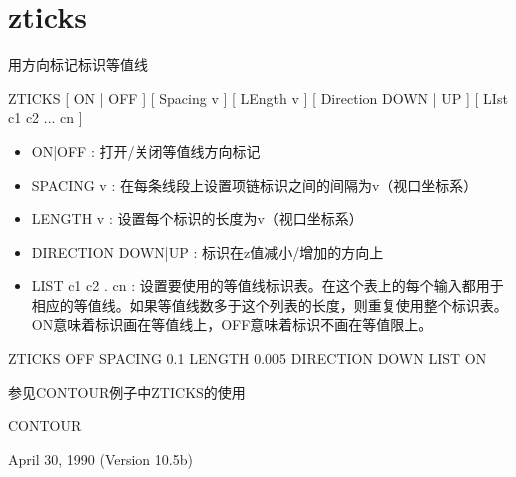 \section{zticks}
\label{cmd:zticks}

用方向标记标识等值线

ZTICKS  [ ON | OFF ] [ Spacing v ] [ LEngth v ] [ Direction DOWN | UP ] [ LIst c1 c2 ... cn ]

\begin{itemize}
\item ON|OFF : 打开/关闭等值线方向标记 
\item SPACING v : 在每条线段上设置项链标识之间的间隔为v（视口坐标系） 
\item LENGTH v : 设置每个标识的长度为v（视口坐标系） 
\item DIRECTION DOWN|UP : 标识在z值减小/增加的方向上 
\item LIST c1 c2 . cn : 设置要使用的等值线标识表。在这个表上的每个输入都用于相应的等值线。如果等值线数多于这个列表的长度，则重复使用整个标识表。ON意味着标识画在等值线上，OFF意味着标识不画在等值限上。 
\end{itemize}

ZTICKS  OFF  SPACING 0.1  LENGTH 0.005  DIRECTION DOWN  LIST ON

参见CONTOUR例子中ZTICKS的使用

CONTOUR

April 30, 1990 (Version 10.5b)
